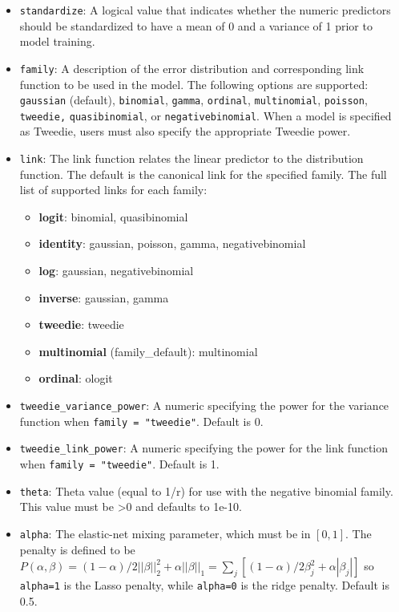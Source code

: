 \begin{itemize}
\item \texttt{standardize}: A logical value that indicates whether the numeric predictors should be standardized to have a mean of 0 and a variance of 1 prior to model training. 
\item \texttt{family}: A description of the error distribution and corresponding link function to be used in the model. The following options are supported: \texttt{gaussian} (default), \texttt{binomial}, \texttt{gamma}, \texttt{ordinal}, \texttt{multinomial}, \texttt{poisson}, \texttt{tweedie,} \texttt{quasibinomial}, or \texttt{negativebinomial}. When a model is specified as Tweedie, users must also specify the appropriate Tweedie power. %
\item \texttt{link}: The link function relates the linear predictor to the distribution function. The default is the canonical link for the specified family. The full list of supported links for each family: 
	\begin{itemize}
\item	{\textbf {logit}}: binomial, quasibinomial
\item {\textbf{identity}}: gaussian, poisson, gamma, negativebinomial
\item {\textbf{log}}: gaussian, negativebinomial
\item {\textbf{inverse}}: gaussian, gamma
\item {\textbf{tweedie}}: tweedie
\item {\textbf{multinomial}} (family\_default): multinomial 
\item {\textbf{ordinal}}: ologit
	\end{itemize}
\item \texttt{tweedie\_variance\_power}: A numeric specifying the power for the variance function when \texttt{family = "tweedie"}.  Default is 0.
\item \texttt{tweedie\_link\_power}: A numeric specifying the power for the link function when \texttt{family = "tweedie"}.  Default is 1.
\item \texttt{theta}: Theta value (equal to 1/r) for use with the negative binomial family. This value must be \textgreater 0 and defaults to 1e-10.
\item \texttt{alpha}: The elastic-net mixing parameter, which must be in $[0,1]$. The penalty is defined to be $P(\alpha,\beta) = (1-\alpha)/2||\beta||_2^2 + \alpha||\beta||_1 = \sum_j [(1-\alpha)/2 \beta_j^2 + \alpha|\beta_j|] $ so \texttt{alpha=1} is the Lasso penalty, while \texttt{alpha=0} is the ridge penalty. Default is 0.5.

\end{itemize}
